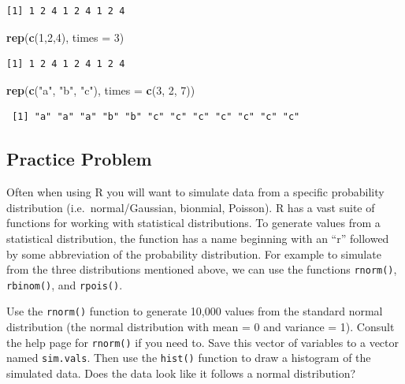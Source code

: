 \documentclass[
]{krantz}
\makeatletter
\newenvironment{Shaded}{\begin{snugshade}}{\end{snugshade}}
\newcommand{\DataTypeTok}[1]{\textcolor[rgb]{0.27,0.27,0.27}{#1}}
\newcommand{\DecValTok}[1]{\textcolor[rgb]{0.06,0.06,0.06}{#1}}
\newcommand{\KeywordTok}[1]{\textcolor[rgb]{0.27,0.27,0.27}{\textbf{#1}}}
\newcommand{\NormalTok}[1]{#1}
\newcommand{\StringTok}[1]{\textcolor[rgb]{0.5,0.5,0.5}{#1}}
\newenvironment{kframe}{%
\medskip{}
\setlength{\fboxsep}{.8em}
 \def\at@end@of@kframe{}%
 \ifinner\ifhmode%
  \def\at@end@of@kframe{\end{minipage}}%
  \begin{minipage}{\columnwidth}%
 \fi\fi%
 \def\FrameCommand##1{\hskip\@totalleftmargin \hskip-\fboxsep
 \colorbox{shadecolor}{##1}\hskip-\fboxsep
     \hskip-\linewidth \hskip-\@totalleftmargin \hskip\columnwidth}%
 \MakeFramed {\advance\hsize-\width
   \@totalleftmargin\z@ \linewidth\hsize
   \@setminipage}}%
 {\par\unskip\endMakeFramed%
 \at@end@of@kframe}
\renewenvironment{Shaded}{\begin{kframe}}{\end{kframe}}
\makeatother
\begin{document}
\begin{verbatim}
[1] 1 2 4 1 2 4 1 2 4
\end{verbatim}

\begin{Shaded}
\begin{Highlighting}[]
\KeywordTok{rep}\NormalTok{(}\KeywordTok{c}\NormalTok{(}\DecValTok{1}\NormalTok{,}\DecValTok{2}\NormalTok{,}\DecValTok{4}\NormalTok{), }\DataTypeTok{times =} \DecValTok{3}\NormalTok{)}
\end{Highlighting}
\end{Shaded}

\begin{verbatim}
[1] 1 2 4 1 2 4 1 2 4
\end{verbatim}

\begin{Shaded}
\begin{Highlighting}[]
\KeywordTok{rep}\NormalTok{(}\KeywordTok{c}\NormalTok{(}\StringTok{"a"}\NormalTok{, }\StringTok{"b"}\NormalTok{, }\StringTok{"c"}\NormalTok{), }\DataTypeTok{times =} \KeywordTok{c}\NormalTok{(}\DecValTok{3}\NormalTok{, }\DecValTok{2}\NormalTok{, }\DecValTok{7}\NormalTok{))}
\end{Highlighting}
\end{Shaded}

\begin{verbatim}
 [1] "a" "a" "a" "b" "b" "c" "c" "c" "c" "c" "c" "c"
\end{verbatim}

\hypertarget{ch4PP3}{%
\subsection{Practice Problem}\label{ch4PP3}}

Often when using R you will want to simulate data from a specific probability distribution (i.e.~normal/Gaussian, bionmial, Poisson). R has a vast suite of functions for working with statistical distributions. To generate values from a statistical distribution, the function has a name beginning with an ``r'' followed by some abbreviation of the probability distribution. For example to simulate from the three distributions mentioned above, we can use the functions \texttt{rnorm()}, \texttt{rbinom()}, and \texttt{rpois()}.

Use the \texttt{rnorm()} function to generate 10,000 values from the standard normal distribution (the normal distribution with mean = 0 and variance = 1). Consult the help page for \texttt{rnorm()} if you need to. Save this vector of variables to a vector named \texttt{sim.vals}. Then use the \texttt{hist()} function to draw a histogram of the simulated data. Does the data look like it follows a normal distribution?
\end{document}
